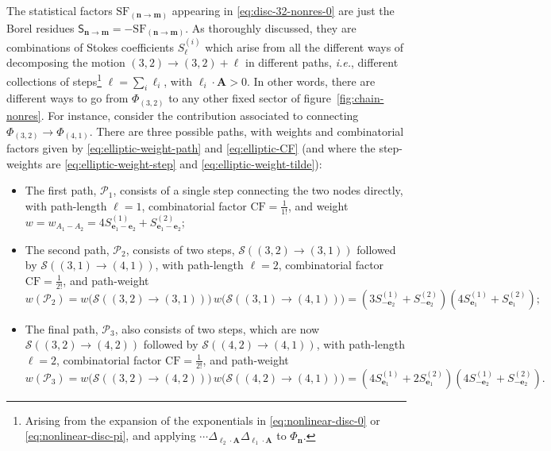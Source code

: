 \documentclass[11pt,a4paper]{article}
\newcommand{\be}{\begin{equation}}
\newcommand{\ee}{\end{equation}}
\begin{document}
The statistical factors $\mathrm{SF}_{( \boldsymbol{n}\rightarrow\boldsymbol{m} )}$  appearing in \eqref{eq:disc-32-nonres-0} are just the Borel residues $\mathsf{S}_{\boldsymbol{n}\rightarrow\boldsymbol{m}} = - \mathrm{SF}_{( \boldsymbol{n}\rightarrow\boldsymbol{m} )}$. As thoroughly discussed, they are combinations of Stokes coefficients $S^{(i)}_{\boldsymbol \ell}$ which arise from all the different ways of decomposing the motion $(3,2) \rightarrow (3,2) + \boldsymbol{\ell}$ in different paths, \textit{i.e.}, different collections of steps\footnote{Arising from the expansion of the exponentials in \eqref{eq:nonlinear-disc-0} or \eqref{eq:nonlinear-disc-pi}, and applying $\cdots \Delta_{\boldsymbol{\ell}_2 \cdot \boldsymbol{A}} \Delta_{\boldsymbol{\ell}_1 \cdot \boldsymbol{A}}$ to $\Phi_{\boldsymbol{n}}$.} $\boldsymbol{\ell} = \sum_i \boldsymbol{\ell}_i$, with $\boldsymbol{\ell}_i \cdot \boldsymbol{A} > 0$. In other words, there are different ways to go from $\Phi_{(3,2)}$ to any other fixed sector of figure~\ref{fig:chain-nonres}. For instance, consider the contribution associated to connecting $\Phi_{(3,2)}\rightarrow \Phi_{(4,1)}$. There are three possible paths, with weights and combinatorial factors given by \eqref{eq:elliptic-weight-path} and \eqref{eq:elliptic-CF} (and where the step-weights are \eqref{eq:elliptic-weight-step} and \eqref{eq:elliptic-weight-tilde}):
%
\begin{itemize}
%
\item The first path, $\mathcal{P}_1$, consists of a single step connecting the two nodes directly, with path-length $\ell=1$, combinatorial factor $\mathrm{CF} = \frac{1}{1!}$, and weight $w = w_{A_1-A_2} = 4 S^{(1)}_{\boldsymbol{e}_1-\boldsymbol{e}_2} + S^{(2)}_{\boldsymbol{e}_1-\boldsymbol{e}_2}$; 
%
\item The second path, $\mathcal{P}_2$, consists of two steps, $\mathcal{S} \left( (3,2) \rightarrow (3,1) \right)$ followed by $\mathcal{S} \left( (3,1) \rightarrow (4,1) \right)$, with path-length $\ell=2$, combinatorial factor $\mathrm{CF} = \frac{1}{2!}$, and path-weight
% 
\be
w (\mathcal{P}_2) = w \Big( \mathcal{S} \left( (3,2) \rightarrow (3,1) \right) \Big)\, w \Big( \mathcal{S} \left( (3,1) \rightarrow (4,1) \right) \Big) = \left( 3 S^{(1)}_{-\boldsymbol{e}_2} + S^{(2)}_{-\boldsymbol{e}_2} \right) \left( 4 S^{(1)}_{\boldsymbol{e}_1} + S^{(2)}_{\boldsymbol{e}_1} \right);
\ee
%
\item The final path, $\mathcal{P}_3$, also consists of two steps, which are now $\mathcal{S} \left( (3,2) \rightarrow (4,2) \right)$ followed by $\mathcal{S} \left( (4,2) \rightarrow (4,1) \right)$, with path-length $\ell=2$, combinatorial factor $\mathrm{CF} = \frac{1}{2!}$, and path-weight
%
\be
w (\mathcal{P}_3) = w \Big( \mathcal{S} \left( (3,2) \rightarrow (4,2) \right) \Big)\, w \Big( \mathcal{S} \left( (4,2) \rightarrow (4,1) \right) \Big) = \left( 4 S^{(1)}_{\boldsymbol{e}_1} + 2 S^{(2)}_{\boldsymbol{e}_1} \right) \left( 4 S^{(1)}_{-\boldsymbol{e}_2} + S^{(2)}_{-\boldsymbol{e}_2} \right). 
\ee
%
\end{itemize}
\end{document}
